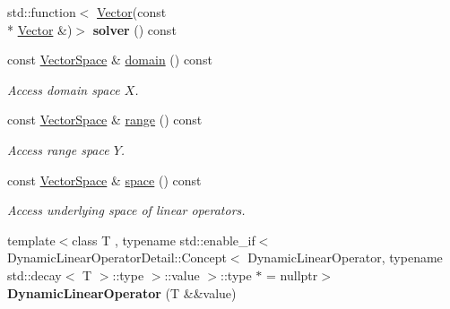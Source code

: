 \begin{DoxyCompactItemize}
\item 
\hypertarget{classSpacy_1_1DynamicLinearOperator_acdd0c580689445355892fa2e78694f76}{std\-::function$<$ \hyperlink{classSpacy_1_1Vector}{Vector}(const \\*
\hyperlink{classSpacy_1_1Vector}{Vector} \&)$>$ {\bfseries solver} () const }\label{classSpacy_1_1DynamicLinearOperator_acdd0c580689445355892fa2e78694f76}

\item 
\hypertarget{classSpacy_1_1DynamicLinearOperator_aa5882565e1a88f20a16f7e7a27df3015}{const \hyperlink{classSpacy_1_1VectorSpace}{Vector\-Space} \& \hyperlink{classSpacy_1_1DynamicLinearOperator_aa5882565e1a88f20a16f7e7a27df3015}{domain} () const }\label{classSpacy_1_1DynamicLinearOperator_aa5882565e1a88f20a16f7e7a27df3015}

\begin{DoxyCompactList}\small\item\em Access domain space $X$. \end{DoxyCompactList}\item 
\hypertarget{classSpacy_1_1DynamicLinearOperator_a08e5f8bd41f1112ae349e50dd773b9ea}{const \hyperlink{classSpacy_1_1VectorSpace}{Vector\-Space} \& \hyperlink{classSpacy_1_1DynamicLinearOperator_a08e5f8bd41f1112ae349e50dd773b9ea}{range} () const }\label{classSpacy_1_1DynamicLinearOperator_a08e5f8bd41f1112ae349e50dd773b9ea}

\begin{DoxyCompactList}\small\item\em Access range space $Y$. \end{DoxyCompactList}\item 
\hypertarget{classSpacy_1_1DynamicLinearOperator_afde64039ceab0ad8752bce3ac2187a41}{const \hyperlink{classSpacy_1_1VectorSpace}{Vector\-Space} \& \hyperlink{classSpacy_1_1DynamicLinearOperator_afde64039ceab0ad8752bce3ac2187a41}{space} () const }\label{classSpacy_1_1DynamicLinearOperator_afde64039ceab0ad8752bce3ac2187a41}

\begin{DoxyCompactList}\small\item\em Access underlying space of linear operators. \end{DoxyCompactList}\item 
\hypertarget{classSpacy_1_1DynamicLinearOperator_a3fb5b02bd4c03894dc502a936a9a3ec8}{{\footnotesize template$<$class T , typename std\-::enable\-\_\-if$<$ Dynamic\-Linear\-Operator\-Detail\-::\-Concept$<$ Dynamic\-Linear\-Operator, typename std\-::decay$<$ T $>$\-::type $>$\-::value $>$\-::type $\ast$  = nullptr$>$ }\\{\bfseries Dynamic\-Linear\-Operator} (T \&\&value)}\label{classSpacy_1_1DynamicLinearOperator_a3fb5b02bd4c03894dc502a936a9a3ec8}


\end{DoxyCompactItemize}
